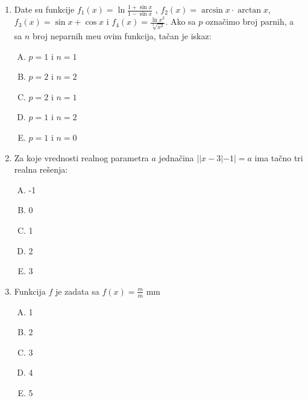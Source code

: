 \documentclass[a4paper,12pt]{report}
\begin{document}
\begin{enumerate}[1.]
\item Date su funkcije  $ f_1(x) = \ln \frac{1 + \sin{x}}{1 - \sin{x}}$ , $ f_2(x) = \arcsin{x} \cdot \arctan{x} $, $ f_3(x) = \sin{x} + \cos{x} $ i $f_4(x) = \frac{\ln{x^2}}{\sqrt[3]{x^2}} $. Ako sa $p$ ozna\v{c}imo broj parnih, a sa $n$ broj neparnih me\dj{}u ovim funkcija, ta\v{c}an je iskaz:
\begin{multicols}{3}
\begin{enumerate}[A)]
\item $p = 1$ i $n = 1$ \item $p = 2$ i $n = 2$ \item $p = 2$ i $n = 1$ \item $p = 1$ i $n = 2$ \item $p = 1$ i $n = 0$
\end{enumerate}
\end{multicols}



\item Za koje vrednosti realnog parametra $a$ jedna\v{c}ina $||x-3|-1|=a$ ima ta\v{c}no tri realna re\v{s}enja:
\begin{multicols}{5}
\begin{enumerate}[A)]
\item -1 \item 0 \item 1 \item 2 \item 3
\end{enumerate}
\end{multicols}


\item Funkcija $f$ je zadata sa $f(x) = \frac{m}{m} $ mm
\begin{multicols}{5}
\begin{enumerate}[A)]
\item 1 \item 2 \item 3 \item 4 \item 5
\end{enumerate}
\end{multicols}








\end{enumerate}
\end{document}
